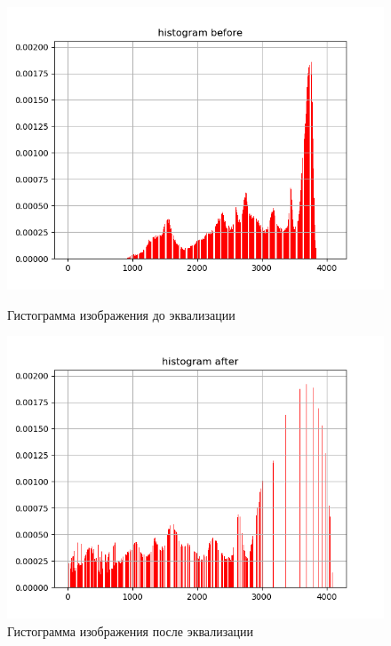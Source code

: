 \documentclass[a4paper,14pt]{extarticle} %
\begin{document}
\begin{figure}[H]
   \begin{minipage}{0.5\textwidth}
     \centering
     \includegraphics[width=\linewidth]{Figure_1}
     \caption{Гистограмма изображения до эквализации}\label{Fig:hist1}
   \end{minipage}\hfill
   \begin{minipage}{0.5\textwidth}
     \centering
     \includegraphics[width=\linewidth]{Figure_2}
     \caption{Гистограмма изображения после эквализации}\label{Fig:hist2}
   \end{minipage}
\end{figure}

\pagebreak
\end{document}
